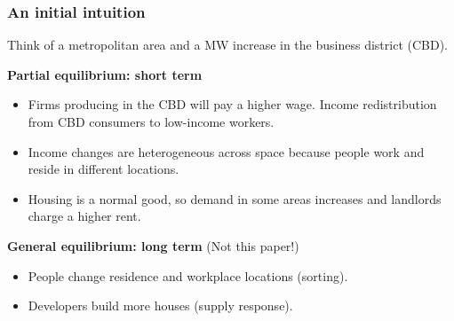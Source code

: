 \documentclass[aspectratio=169, t]{beamer}
\begin{document}
\begin{frame}
    \frametitle{An initial intuition}
    
    \vspace{3mm}
    
    Think of a metropolitan area and a MW increase in the business district (CBD). 
    
    \vspace{3mm}
    
    \textbf{Partial equilibrium: short term}
    \begin{itemize}
        \vspace{.5mm} \item Firms producing in the CBD will pay a higher wage. Income 
        redistribution from CBD consumers to low-income workers.
        \vspace{.5mm} \item Income changes are heterogeneous across space because people work 
        and reside in different locations.
        \vspace{.5mm} \item Housing is a normal good, so demand in some areas increases 
        and landlords charge a higher rent.
    \end{itemize}

    \pause
    \vspace{3mm}
    \textbf{General equilibrium: long term} (Not this paper!)
    \begin{itemize}
    \vspace{.5mm} \item People change residence and workplace locations (sorting).
    \vspace{.5mm} \item Developers build more houses (supply response).
\end{itemize}
\end{frame}
\end{document}
